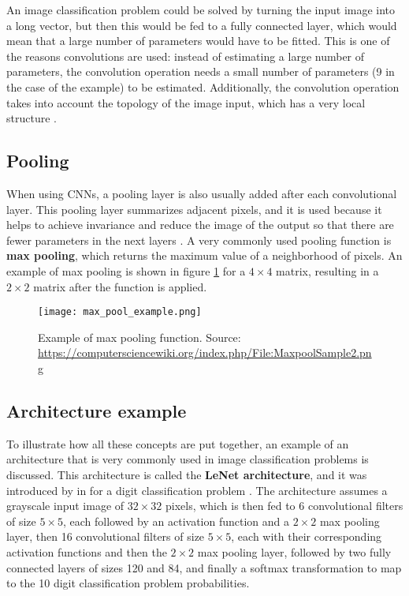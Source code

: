 An image classification problem could be solved by turning the input image into a long vector, but then this would be fed to a fully connected layer, which would mean that a large number of parameters would have to be fitted. This is one of the reasons convolutions are used: instead of estimating a large number of parameters, the convolution operation needs a small number of parameters (9 in the case of the example) to be estimated. Additionally, the convolution operation takes into account the topology of the image input, which has a very local structure \cite{lecun1998gradient}.

\subsection{Pooling}

When using CNNs, a pooling layer is also usually added after each convolutional layer. This pooling layer summarizes adjacent pixels, and it is used because it helps to achieve invariance and reduce the image of the output so that there are fewer parameters in the next layers \cite{bengio2015deep}. A very commonly used pooling function is \textbf{max pooling}, which returns the maximum value of a neighborhood of pixels. An example of max pooling is shown in figure \ref{fig:max_pool_example} for a $4 \times 4$ matrix, resulting in a $2 \times 2$ matrix after the function is applied.

\begin{figure}[H]
    \centering
    \texttt{[image: max\_pool\_example.png]}
    \caption{Example of max pooling function. Source: \url{https://computersciencewiki.org/index.php/File:MaxpoolSample2.png}}
    \label{fig:max_pool_example}
\end{figure}


\subsection{Architecture example}

To illustrate how all these concepts are put together, an example of an architecture that is very commonly used in image classification problems is discussed. This architecture is called the \textbf{LeNet architecture}, and it was introduced by \citeauthor{lecun1998gradient} in \citeyear{lecun1998gradient} for a digit classification problem \cite{lecun1998gradient}. The architecture assumes a grayscale input image of $32 \times 32$ pixels, which is then fed to 6 convolutional filters of size $5 \times 5$, each followed by an activation function and a $2 \times 2$ max pooling layer, then 16 convolutional filters of size $5 \times 5$, each with their corresponding activation functions and then the $2 \times 2$ max pooling layer, followed by two fully connected layers of sizes 120 and 84, and finally a softmax transformation to map to the 10 digit classification problem probabilities.

